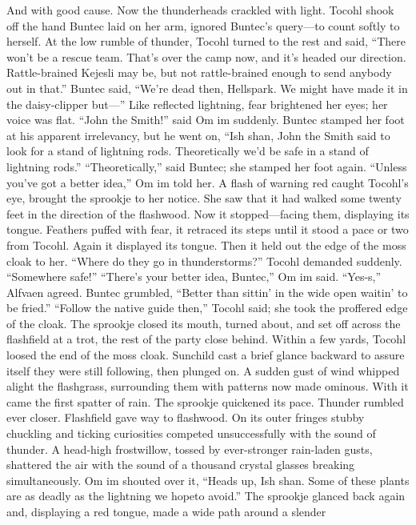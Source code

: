 \documentclass[9pt]{article}
\begin{document}
And with good cause.
Now the thunderheads crackled with light. Tocohl shook off the hand Buntec laid on her arm,
ignored Buntec’s query—to count softly to herself.
At the low rumble of thunder, Tocohl turned to the rest and said, “There won’t be a rescue team.
That’s over the camp now, and it’s headed our direction. Rattle-brained Kejesli may be, but not
rattle-brained enough to send anybody out in that.”
Buntec said, “We’re dead then, Hellspark. We might have made it in the daisy-clipper but—” Like
reflected lightning, fear brightened her eyes; her voice was flat.
“John the Smith!” said Om im suddenly. Buntec stamped her foot at his apparent irrelevancy, but he
went on, “Ish shan, John the Smith said to look for a stand of lightning rods. Theoretically we’d be safe in
a stand of lightning rods.”
“Theoretically,” said Buntec; she stamped her foot again.
“Unless you’ve got a better idea,” Om im told her.
A flash of warning red caught Tocohl’s eye, brought the sprookje to her notice. She saw that it had
walked some twenty feet in the direction of the flashwood. Now it stopped—facing them, displaying its
tongue.
Feathers puffed with fear, it retraced its steps until it stood a pace or two from Tocohl. Again it
displayed its tongue. Then it held out the edge of the moss cloak to her.
“Where do they go in thunderstorms?” Tocohl demanded suddenly. “Somewhere safe!”
“There’s your better idea, Buntec,” Om im said.
“Yes-s,” Alfvaen agreed.
Buntec grumbled, “Better than sittin’ in the wide open waitin’ to be fried.”
“Follow the native guide then,” Tocohl said; she took the proffered edge of the cloak. The sprookje
closed its mouth, turned about, and set off across the flashfield at a trot, the rest of the party close
behind.
Within a few yards, Tocohl loosed the end of the moss cloak. Sunchild cast a brief glance backward
to assure itself they were still following, then plunged on. A sudden gust of wind whipped alight the
flashgrass, surrounding them with patterns now made ominous. With it came the first spatter of rain. The
sprookje quickened its pace.
Thunder rumbled ever closer.
Flashfield gave way to flashwood. On its outer fringes stubby chuckling and ticking curiosities
competed unsuccessfully with the sound of thunder. A head-high frostwillow, tossed by ever-stronger
rain-laden gusts, shattered the air with the sound of a thousand crystal glasses breaking simultaneously.
Om im shouted over it, “Heads up, Ish shan. Some of these plants are as deadly as the lightning we hopeto avoid.”
The sprookje glanced back again and, displaying a red tongue, made a wide path around a slender
\end{document}
